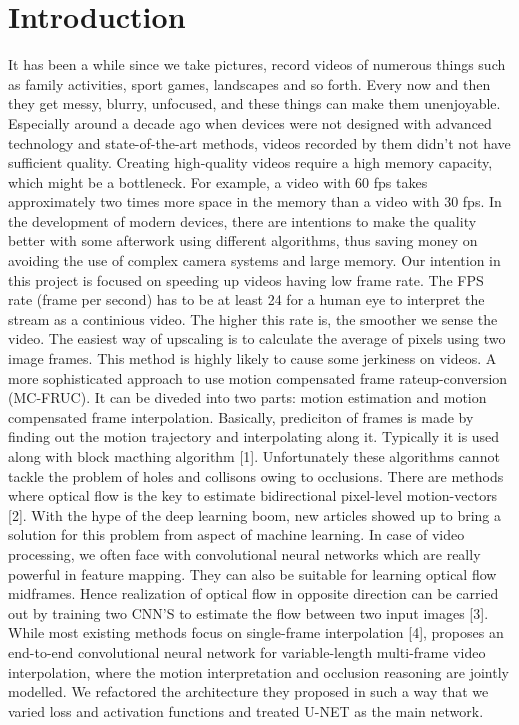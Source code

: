\documentclass{article}
\begin{document}
\section{Introduction}
\label{data}
It has been a while since we take pictures, record videos of numerous things such as family activities,
sport games, landscapes and so forth. Every now and then they get messy, blurry, unfocused, and  these things can make them unenjoyable. Especially around a decade ago
when devices were not designed with advanced technology and state-of-the-art methods, videos recorded by them didn't not have sufficient quality. Creating high-quality videos require a high memory capacity, which might be a bottleneck. For example, a video with 60 fps takes approximately two times more space in the memory than a video with 30 fps. In the development of modern devices, there are intentions to make the quality better with some afterwork using different algorithms, thus saving money on avoiding the use of complex camera systems and large memory. Our intention in this project is focused on speeding up videos having low frame rate. The FPS rate (frame per second) has to be at least 24 for a human eye  to interpret the stream as a continious video. The higher this rate is, the smoother we sense the video. The easiest way of upscaling is to calculate the average of pixels using two image frames. This method is highly likely to cause some jerkiness on videos. A more sophisticated approach to use motion compensated frame rateup-conversion (MC-FRUC). It can be diveded into two parts: motion estimation and motion compensated frame interpolation. Basically, prediciton of frames is made by finding out the motion trajectory and interpolating along it.
Typically it is used along with block macthing algorithm [1]. Unfortunately these algorithms cannot tackle the problem of holes and collisons owing to occlusions. There are methods where optical flow is the key to estimate bidirectional pixel-level motion-vectors [2]. With the hype of the deep learning boom, new articles showed up to bring a solution for this problem from aspect
of machine learning. In case of video processing, we often face with convolutional neural networks which are really powerful in feature mapping. They can also be suitable for learning optical flow midframes. Hence realization of optical flow in opposite direction can be carried out by training two CNN’S to estimate the flow between two input images [3]. While most existing methods focus on single-frame
interpolation [4], proposes an end-to-end convolutional neural network for variable-length multi-frame video interpolation, where the motion interpretation and occlusion reasoning are jointly modelled. We refactored the architecture they proposed in such a way that we varied loss and activation functions and treated U-NET as the main network.
\end{document}
